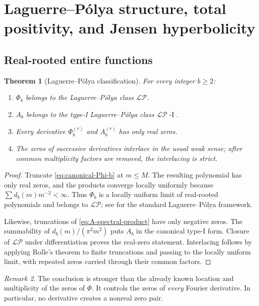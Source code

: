 \documentclass[11pt]{article}
\newtheorem{theorem}{Theorem}[section]
\theoremstyle{definition}
\theoremstyle{remark}
\newtheorem{remark}[theorem]{Remark}
\newcommand{\LP}{\mathcal{LP}}
\newcommand{\LPI}{\mathcal{LP}\!\operatorname{-I}}
\begin{document}
\section{Laguerre--P\'olya structure, total positivity, and Jensen hyperbolicity}

\subsection{Real-rooted entire functions}

\begin{theorem}[Laguerre--P\'olya classification]\label{thm:LP}
For every integer \(b\ge2\):
\begin{enumerate}[label=\textnormal{(\roman*)}]
  \item \(\Phi_b\) belongs to the Laguerre--P\'olya class \(\LP\).
  \item \(A_b\) belongs to the type-I Laguerre--P\'olya class \(\LPI\).
  \item Every derivative \(\Phi_b^{(r)}\) and \(A_b^{(r)}\) has only real zeros.
  \item The zeros of successive derivatives interlace in the usual weak sense; after common multiplicity factors are removed, the interlacing is strict.
\end{enumerate}
\end{theorem}

\begin{proof}
Truncate \eqref{eq:canonical-Phi-b} at \(m\le M\).  The resulting polynomial has only real zeros, and the products converge locally uniformly because
\(\sum d_b(m)m^{-2}<\infty\).  Thus \(\Phi_b\) is a locally uniform limit of real-rooted polynomials and belongs to \(\LP\); see \cite{Levin1996} for the standard Laguerre--P\'olya framework.

Likewise, truncations of \eqref{eq:A-spectral-product} have only negative zeros.  The summability of
\(d_b(m)/(\pi^2m^2)\) puts \(A_b\) in the canonical type-I form.  Closure of \(\LP\) under differentiation proves the real-zero statement.  Interlacing follows by applying Rolle's theorem to finite truncations and passing to the locally uniform limit, with repeated zeros carried through their common factors.
\end{proof}

\begin{remark}
The conclusion is stronger than the already known location and multiplicity of the zeros of \(\Phi\).  It controls the zeros of \emph{every} Fourier derivative.  In particular, no derivative creates a nonreal zero pair.
\end{remark}
\end{document}
